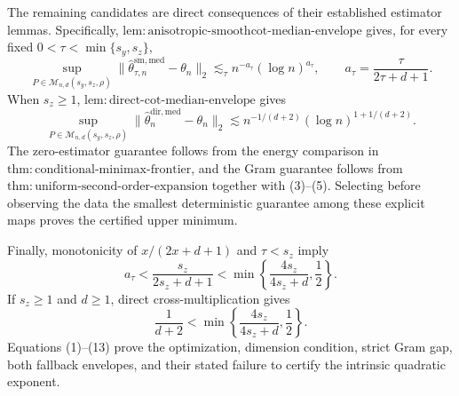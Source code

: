 The remaining candidates are direct consequences of their established estimator lemmas.  Specifically,
\(\mathrm{lem{:}anisotropic\text{-}smoothcot\text{-}median\text{-}envelope}\) gives, for every fixed \(0<\tau<\min\{s_y,s_z\}\),
\[
\sup_{P\in\mathcal M_{n,d}(s_y,s_z,\rho)}
\|\widehat\theta^{\mathrm{sm,med}}_{\tau,n}-\theta_n\|_2
\lesssim_\tau n^{-a_\tau}(\log n)^{a_\tau},
\qquad a_\tau=\frac{\tau}{2\tau+d+1}.                    \tag{10}
\]
When \(s_z\ge1\),
\(\mathrm{lem{:}direct\text{-}cot\text{-}median\text{-}envelope}\) gives
\[
\sup_{P\in\mathcal M_{n,d}(s_y,s_z,\rho)}
\|\widehat\theta_n^{\mathrm{dir,med}}-\theta_n\|_2
\lesssim n^{-1/(d+2)}(\log n)^{1+1/(d+2)}.                 \tag{11}
\]
The zero-estimator guarantee follows from the energy comparison in
\(\mathrm{thm{:}conditional\text{-}minimax\text{-}frontier}\), and the Gram guarantee follows from
\(\mathrm{thm{:}uniform\text{-}second\text{-}order\text{-}expansion}\) together with (3)--(5).  Selecting before observing the data the smallest deterministic guarantee among these explicit maps proves the certified upper minimum.

Finally, monotonicity of \(x/(2x+d+1)\) and \(\tau<s_z\) imply
\[
a_\tau<\frac{s_z}{2s_z+d+1}
<\min\left\{\frac{4s_z}{4s_z+d},\frac12\right\}.          \tag{12}
\]
If \(s_z\ge1\) and \(d\ge1\), direct cross-multiplication gives
\[
\frac1{d+2}<\min\left\{\frac{4s_z}{4s_z+d},\frac12\right\}. \tag{13}
\]
Equations (1)--(13) prove the optimization, dimension condition, strict Gram gap, both fallback envelopes, and their stated failure to certify the intrinsic quadratic exponent.